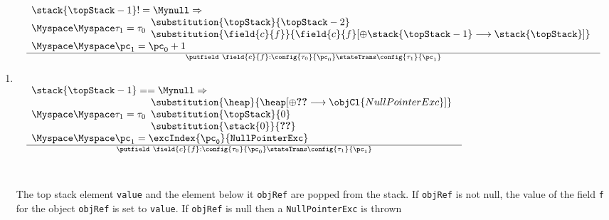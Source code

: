 \begin{itemize}
\begin{enumerate}
      \item \putfield  
            $$\begin{array}{l} 
	      \frac{    
	          \begin{array}{l}
                      \stack{\topStack - 1} != \Mynull \Rightarrow \\
		      	\Myspace \Myspace      \tau_{1} =  \tau_{0} 
			                                      \begin{array}{l} \substitution{\topStack}{\topStack - 2} \\
		                                               \substitution{\field{c}{f}   }{\field{c}{f} [\oplus  \stack{\topStack-1} \longrightarrow  \stack{\topStack }] } 
							       \end{array} \\
		    	\Myspace \Myspace     \pc_1   = \pc_0 + 1                
		      \end{array}}  
		      {\putfield \ \field{c}{f}: \config{\tau_{0}}{\pc_0} \stateTrans  \config{\tau_{1}}{\pc_1}}
		      
                     \\ 
                     \\ 
		     \\
		     \frac{    
	                   \begin{array}{l}
			           \stack{\topStack - 1} == \Mynull \Rightarrow  \\
				   \Myspace \Myspace    \tau_{1} = \tau_{0}  \begin{array}{l}\substitution{\heap}{\heap[ \oplus \Ref{NullPointerExc} \longrightarrow \objCl{NullPointerExc} ]  } \\
      		                                  	     \substitution{\topStack}{0} \\
       		      	                                     \substitution{\stack{0}}{\Ref{NullPointerExc}  }
					       \end{array} \\
          			\Myspace \Myspace    \pc_1  = \tt{ \excIndex{\pc_0 }{NullPointerExc}}\\
       		 \end{array} }
              {\putfield \ \field{c}{f}: \config{\tau_{0}}{\pc_0} \stateTrans  \config{\tau_{1}}{\pc_1}} 	 \end{array} $$ \\\\
	      
        The top stack element \texttt{value} and the element below it \texttt{objRef} are popped from the stack. 
		  If \texttt{objRef} is not null, the value of the field \texttt{f} for the object  \texttt{objRef} is set
		  to \texttt{value}. If \texttt{objRef} is null then a \texttt{NullPointerExc} is thrown


\end{enumerate}
\end{itemize}
